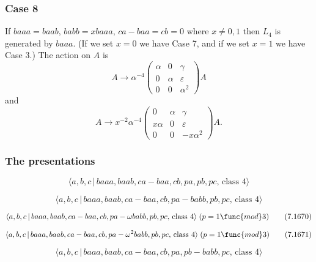 \documentclass[10pt]{article}
\begin{document}
\subsubsection{Case 8}

If $baaa=baab,\,babb=xbaaa,\,ca-baa=cb=0$ where $x\neq 0,1$ then $L_{4}$ is
generated by $baaa$. (If we set $x=0$ we have Case 7, and if we set $x=1$ we
have Case 3.) The action on $A$ is 
\[
A\rightarrow \alpha ^{-4}\left( 
\begin{array}{lll}
\alpha & 0 & \gamma \\ 
0 & \alpha & \varepsilon \\ 
0 & 0 & \alpha ^{2}%
\end{array}%
\right) A 
\]%
and 
\[
A\rightarrow x^{-2}\alpha ^{-4}\left( 
\begin{array}{lll}
0 & \alpha & \gamma \\ 
x\alpha & 0 & \varepsilon \\ 
0 & 0 & -x\alpha ^{2}%
\end{array}%
\right) A. 
\]

\subsubsection{The presentations}

\begin{equation}
\langle a,b,c\,|\,baaa,baab,ca-baa,cb,pa,pb,pc,\,\text{class }4\rangle 
\tag{7.1668}
\end{equation}

\begin{equation}
\langle a,b,c\,|\,baaa,baab,ca-baa,cb,pa-babb,pb,pc,\,\text{class }4\rangle 
\tag{7.1669}
\end{equation}

\begin{equation}
\langle a,b,c\,|\,baaa,baab,ca-baa,cb,pa-\omega babb,pb,pc,\,\text{class }%
4\rangle \;(p=1\func{mod}3)  \tag{7.1670}
\end{equation}

\begin{equation}
\langle a,b,c\,|\,baaa,baab,ca-baa,cb,pa-\omega ^{2}babb,pb,pc,\,\text{class 
}4\rangle \;(p=1\func{mod}3)  \tag{7.1671}
\end{equation}

\begin{equation}
\langle a,b,c\,|\,baaa,baab,ca-baa,cb,pa,pb-babb,pc,\,\text{class }4\rangle 
\tag{7.1672}
\end{equation}
\end{document}
